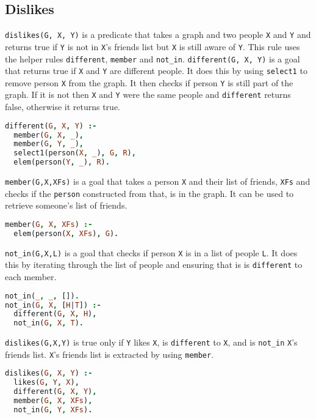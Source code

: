 \documentclass{article}
\begin{document}
\subsection{Dislikes}
\texttt{dislikes(G, X, Y)} is a predicate that takes a graph and two people \texttt{X} and \texttt{Y} and returns true if \texttt{Y} is not in \texttt{X}'s friends list but \texttt{X} is still aware of \texttt{Y}. This rule uses the helper rules \texttt{different}, \texttt{member} and \texttt{not\_in}.
\bigbreak
\texttt{different(G, X, Y)} is a goal that returns true if \texttt{X} and \texttt{Y} are different people. It does this by using \texttt{select1} to remove person \texttt{X} from the graph. It then checks if person \texttt{Y} is still part of the graph. If it is not then \texttt{X} and \texttt{Y} were the same people and \texttt{different} returns false, otherwise it returns true.
\begin{lstlisting}[language=Prolog]
different(G, X, Y) :-
  member(G, X, _),
  member(G, Y, _),
  select1(person(X, _), G, R),
  elem(person(Y, _), R).
\end{lstlisting}
\texttt{member(G,X,XFs)} is a goal that takes a person \texttt{X} and their list of friends, \texttt{XFs} and checks if the \texttt{person} constructed from that, is in the graph. It can be used to retrieve someone's list of friends.
\begin{lstlisting}[language=Prolog]
member(G, X, XFs) :-
  elem(person(X, XFs), G).
\end{lstlisting}
\texttt{not\_in(G,X,L)} is a goal that checks if person \texttt{X} is in a list of people \texttt{L}. It does this by iterating through the list of people and ensuring that is is \texttt{different} to each member.
\begin{lstlisting}[language=Prolog]
not_in(_, _, []).
not_in(G, X, [H|T]) :-
  different(G, X, H),
  not_in(G, X, T).
\end{lstlisting}
\texttt{dislikes(G,X,Y)} is true only if \texttt{Y} likes \texttt{X}, is \texttt{different} to \texttt{X}, and is \texttt{not\_in} \texttt{X}'s friends list. \texttt{X}'s friends list is extracted by using \texttt{member}.
\begin{lstlisting}[language=Prolog]
dislikes(G, X, Y) :-
  likes(G, Y, X),
  different(G, X, Y),
  member(G, X, XFs),
  not_in(G, Y, XFs).
\end{lstlisting}
\end{document}
